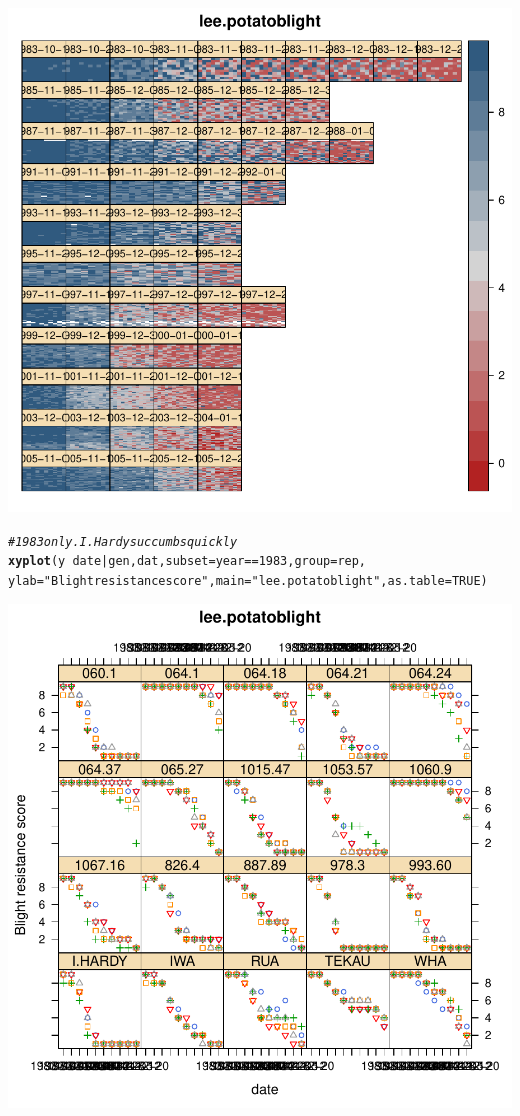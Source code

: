 \documentclass[12pt]{article}\usepackage[]{graphicx}\usepackage[]{color}
\makeatletter
\def\maxwidth{ %
  \ifdim\Gin@nat@width>\linewidth
    \linewidth
  \else
    \Gin@nat@width
  \fi
}
\newcommand{\hlnum}[1]{\textcolor[rgb]{0.686,0.059,0.569}{#1}}%
\newcommand{\hlstr}[1]{\textcolor[rgb]{0.192,0.494,0.8}{#1}}%
\newcommand{\hlcom}[1]{\textcolor[rgb]{0.678,0.584,0.686}{\textit{#1}}}%
\newcommand{\hlopt}[1]{\textcolor[rgb]{0,0,0}{#1}}%
\newcommand{\hlstd}[1]{\textcolor[rgb]{0.345,0.345,0.345}{#1}}%
\newcommand{\hlkwc}[1]{\textcolor[rgb]{0.333,0.667,0.333}{#1}}%
\newcommand{\hlkwd}[1]{\textcolor[rgb]{0.737,0.353,0.396}{\textbf{#1}}}%
\newenvironment{kframe}{%
 \def\at@end@of@kframe{}%
 \ifinner\ifhmode%
  \def\at@end@of@kframe{\end{minipage}}%
  \begin{minipage}{\columnwidth}%
 \fi\fi%
 \def\FrameCommand##1{\hskip\@totalleftmargin \hskip-\fboxsep
 \colorbox{shadecolor}{##1}\hskip-\fboxsep
     \hskip-\linewidth \hskip-\@totalleftmargin \hskip\columnwidth}%
 \MakeFramed {\advance\hsize-\width
   \@totalleftmargin\z@ \linewidth\hsize
   \@setminipage}}%
 {\par\unskip\endMakeFramed%
 \at@end@of@kframe}
\newenvironment{knitrout}{}{} %
\makeatother
\begin{document}
\begin{knitrout}
{\centering \includegraphics[width=\maxwidth]{figs/ag2-unnamed-chunk-21} 

}


\begin{kframe}\begin{alltt}
\hlcom{# 1983 only.  I.Hardy succumbs quickly}
\hlkwd{xyplot}\hlstd{(y} \hlopt{~} \hlstd{date}\hlopt{|}\hlstd{gen, dat,} \hlkwc{subset}\hlstd{=year}\hlopt{==}\hlnum{1983}\hlstd{,} \hlkwc{group}\hlstd{=rep,}
       \hlkwc{ylab}\hlstd{=}\hlstr{"Blight resistance score"}\hlstd{,} \hlkwc{main}\hlstd{=}\hlstr{"lee.potatoblight"}\hlstd{,} \hlkwc{as.table}\hlstd{=}\hlnum{TRUE}\hlstd{)}
\end{alltt}
\end{kframe}

{\centering \includegraphics[width=\maxwidth]{figs/ag2-unnamed-chunk-22} 

}
\end{knitrout}
\end{document}
